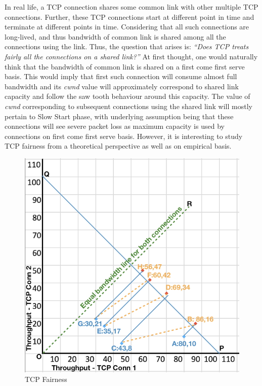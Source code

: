 \begin{multicols}{2}
In real life, a TCP connection shares  some common link with other multiple TCP connections. Further, these TCP connections start at different point in time and terminate at different points in time.  Considering that all such connections are long-lived, and thus bandwidth of common link is shared among all the connections using the link. Thus, the question that arises is: \textit{“Does TCP treats fairly all the connections on a shared link?”} At first thought, one would naturally think that the bandwidth of common link is shared on a first come first serve basis. This would imply that first such connection will consume almost full bandwidth and its \textit{cwnd} value will approximately correspond to shared link capacity and follow the saw tooth behaviour around this capacity. The value of \textit{cwnd} corresponding to subsequent connections using the shared link will mostly pertain to Slow Start phase, with underlying assumption being that these connections will see severe packet loss as maximum capacity is used by connections on first come first serve basis. However, it is interesting to study TCP fairness from a theoretical perspective as well as on empirical basis.
\begin{figure}[H]
\centering
\includegraphics[scale=1.27]{src/Figures/chap2/chap2-fig06.jpg}
\caption{TCP Fairness}\label{chap2-fig06}
\end{figure}


\end{multicols}
